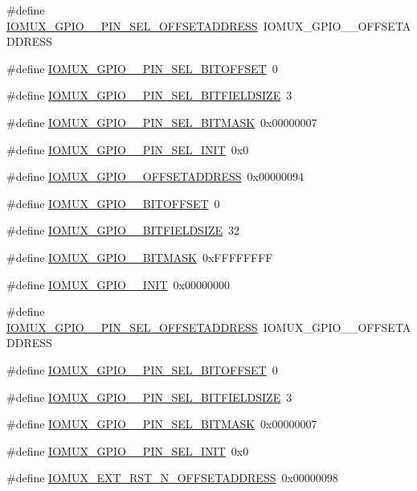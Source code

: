 \begin{DoxyCompactItemize}
\item 
\#define \hyperlink{a00560_a20c01bd85e8d8e63398cbeb46e4e1307}{IOMUX\_\-GPIO\_\_\-PIN\_\-SEL\_\-OFFSETADDRESS}~IOMUX\_\-GPIO\_\_\-OFFSETADDRESS
\item 
\#define \hyperlink{a00560_a171f761f55dda34857b199b8ccba41a3}{IOMUX\_\-GPIO\_\_\-PIN\_\-SEL\_\-BITOFFSET}~0
\item 
\#define \hyperlink{a00560_a7bc3fac1a7d9c7eef94519073696d475}{IOMUX\_\-GPIO\_\_\-PIN\_\-SEL\_\-BITFIELDSIZE}~3
\item 
\#define \hyperlink{a00560_a479534260e1b6d70459539e76abbe69d}{IOMUX\_\-GPIO\_\_\-PIN\_\-SEL\_\-BITMASK}~0x00000007
\item 
\#define \hyperlink{a00560_ad5b288df5af74f8598b6de2df818d5e2}{IOMUX\_\-GPIO\_\_\-PIN\_\-SEL\_\-INIT}~0x0
\item 
\#define \hyperlink{a00560_a66d49593bfd5021ba25de9aed9847750}{IOMUX\_\-GPIO\_\_\-OFFSETADDRESS}~0x00000094
\item 
\#define \hyperlink{a00560_a87581e9c574451156e9861fee5204564}{IOMUX\_\-GPIO\_\_\-BITOFFSET}~0
\item 
\#define \hyperlink{a00560_ab1da5e0de073672a27b4a5639d43ee52}{IOMUX\_\-GPIO\_\_\-BITFIELDSIZE}~32
\item 
\#define \hyperlink{a00560_a9a1bcab77db0705818e5d0f00b5ed051}{IOMUX\_\-GPIO\_\_\-BITMASK}~0xFFFFFFFF
\item 
\#define \hyperlink{a00560_a026fae1616c63e40fde7f2eb1b38230d}{IOMUX\_\-GPIO\_\_\-INIT}~0x00000000
\item 
\#define \hyperlink{a00560_a0a4ed3c92eadbef0a0f55804008c0830}{IOMUX\_\-GPIO\_\_\-PIN\_\-SEL\_\-OFFSETADDRESS}~IOMUX\_\-GPIO\_\_\-OFFSETADDRESS
\item 
\#define \hyperlink{a00560_af26d4575fb46ab6c47622621e205933a}{IOMUX\_\-GPIO\_\_\-PIN\_\-SEL\_\-BITOFFSET}~0
\item 
\#define \hyperlink{a00560_adced4641da7a1c0cecbd85e0bd8520a6}{IOMUX\_\-GPIO\_\_\-PIN\_\-SEL\_\-BITFIELDSIZE}~3
\item 
\#define \hyperlink{a00560_a6cc555d764489e5a1e355f92e2a55d4f}{IOMUX\_\-GPIO\_\_\-PIN\_\-SEL\_\-BITMASK}~0x00000007
\item 
\#define \hyperlink{a00560_a41a0015428bc6f67edd636ebbb7e3825}{IOMUX\_\-GPIO\_\_\-PIN\_\-SEL\_\-INIT}~0x0
\item 
\#define \hyperlink{a00560_ad018787a6a3c2bcdc14c01ed96faf722}{IOMUX\_\-EXT\_\-RST\_\-N\_\-OFFSETADDRESS}~0x00000098
\item 

\end{DoxyCompactItemize}
